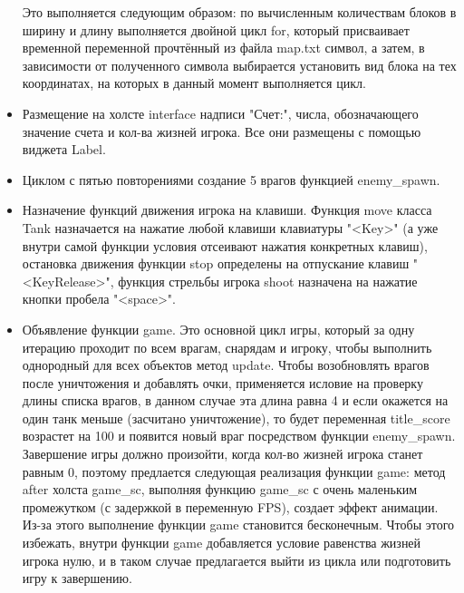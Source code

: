 \begin{itemize}
Это выполняется следующим образом: по вычисленным количествам блоков в ширину и длину выполняется двойной цикл for, который присваивает временной переменной прочтённый из файла map.txt символ, а затем, в зависимости от полученного символа выбирается установить вид блока на тех координатах, на которых в данный момент выполняется цикл.
\item Размещение на холсте interface надписи "Счет:", числа, обозначающего значение счета и кол-ва жизней игрока. Все они размещены с помощью виджета Label.
\item Циклом с пятью повторениями создание 5 врагов функцией enemy\_spawn.
\item Назначение функций движения игрока на клавиши. Функция move класса Tank назначается на нажатие любой клавиши клавиатуры "<Key>" (а уже внутри самой функции условия отсеивают нажатия конкретных клавиш), остановка движения функции stop определены на отпускание клавиш "<KeyRelease>", функция стрельбы игрока shoot назначена на нажатие кнопки пробела "<space>".
\item Объявление функции game. Это основной цикл игры, который за одну итерацию проходит по всем врагам, снарядам и игроку, чтобы выполнить однородный для всех объектов метод update. Чтобы возобновлять врагов после уничтожения и добавлять очки, применяется исловие на проверку длины списка врагов, в данном случае эта длина равна 4 и если окажется на один танк меньше (засчитано уничтожение), то будет переменная title\_score возрастет на 100 и появится новый враг посредством функции enemy\_spawn. Завершение игры должно произойти, когда кол-во жизней игрока станет равным 0, поэтому предлается следующая реализация функции game: метод after холста game\_sc, выполняя функцию game\_sc с очень маленьким промежутком (с задержкой в переменную FPS), создает эффект анимации. Из-за этого выполнение функции game становится бесконечным. Чтобы этого избежать, внутри функции game добавляется условие равенства жизней игрока нулю, и в таком случае предлагается выйти из цикла или подготовить игру к завершению.
\end{itemize}

